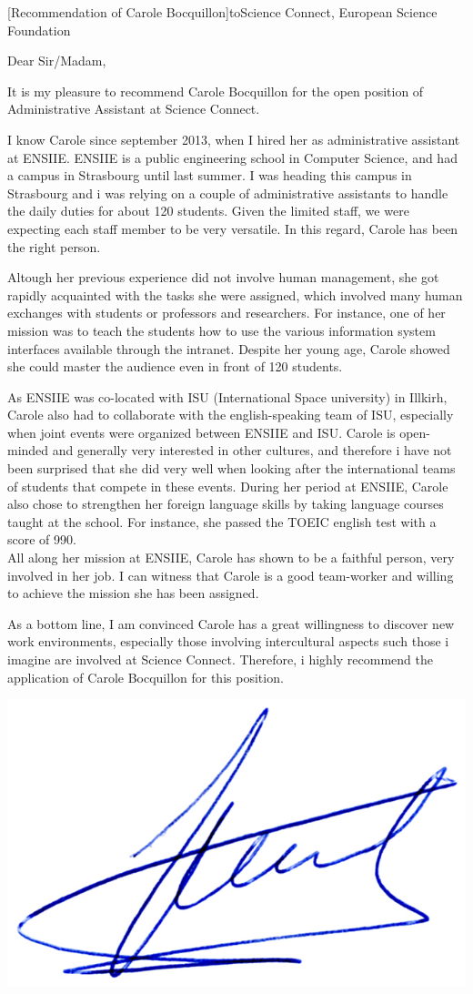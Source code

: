 \documentclass[a4paper,10pt]{article}
\begin{document}

\begin{letter}[Recommendation of Carole Bocquillon]{to}{Science Connect,
    European Science Foundation}

\vspace{-2cm}
Dear Sir/Madam,

It is my pleasure to recommend Carole Bocquillon for the open position of
Administrative Assistant at Science Connect.

I know Carole since september 2013, when I hired her as administrative assistant
at ENSIIE. ENSIIE is a public engineering  school in Computer Science, and had a
campus in Strasbourg until last summer.  I was heading this campus in Strasbourg
and i was relying  on a couple of administrative assistants  to handle the daily
duties for about  120 students. Given the limited staff,  we were expecting each
staff member  to be very  versatile. In this regard,  Carole has been  the right
person.

Altough  her previous  experience  did  not involve  human  management, she  got
rapidly acquainted with  the tasks she were assigned, which  involved many human
exchanges with students or professors and  researchers. For instance, one of her
mission was  to teach  the students  how to use  the various  information system
interfaces available through the intranet.  Despite her young age, Carole showed
she could master the audience even in front of 120 students.
 
As ENSIIE was  co-located with ISU (International Space  university) in Illkirh,
Carole also had to collaborate with the english-speaking team of ISU, especially
when joint events were organized between  ENSIIE and ISU.  Carole is open-minded
and generally very  interested in other cultures, and therefore  i have not been
surprised that she  did very well when looking after  the international teams of
students that compete in these events.  During her period at ENSIIE, Carole also
chose  to strengthen  her foreign  language skills  by taking  language courses
taught at  the school. For  instance, she passed the  TOEIC english test  with a
score of 990.\\[-5mm]

All along her mission at ENSIIE, Carole has shown to be a faithful person, very
involved in her job. I can witness that Carole is a good team-worker and willing
to achieve the mission she has been assigned.

As a bottom line, I am convinced Carole has a great willingness to discover new
work environments, especially those involving intercultural aspects such those
i imagine are involved at Science Connect. Therefore, i highly recommend the
application of Carole Bocquillon for this position.


\end{letter}
\vspace{-.8cm}
\begin{flushright}
\includegraphics[width=.26\textwidth]{signgenaud.jpg}
\end{flushright}
%
%
\end{document}
